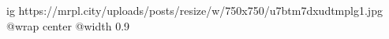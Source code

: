  
 
 
 
 

\ifcmt
  ig https://mrpl.city/uploads/posts/resize/w/750x750/u7btm7dxudtmplg1.jpg
  @wrap center
  @width 0.9
\fi
